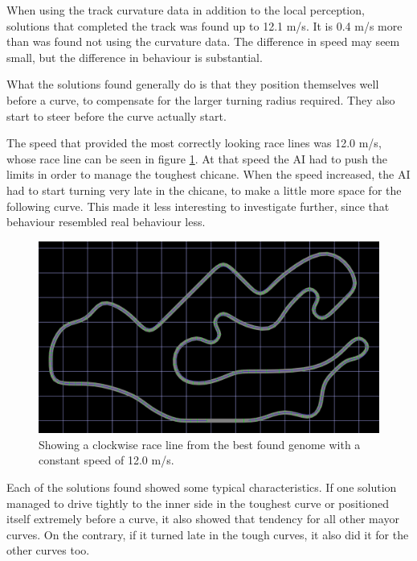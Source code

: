 

When using the track curvature data in addition to the local perception, solutions that completed the track was found up to 12.1 m/s. It is 0.4 m/s more than was found not using the curvature data. The difference in speed may seem small, but the difference in behaviour is substantial.

What the solutions found generally do is that they position themselves well before a curve, to compensate for the larger turning radius required. They also start to steer before the curve actually start.

The speed that provided the most correctly looking race lines was 12.0 m/s, whose race line can be seen in figure \ref{fig:constantspeedline}. At that speed the AI had to push the limits in order to manage the toughest chicane. When the speed increased, the AI had to start turning very late in the chicane, to make a little more space for the following curve. This made it less interesting to investigate further, since that behaviour resembled real behaviour less.

\begin{figure}[h]
\includegraphics[width=\textwidth]{report/images/fixed_curve_data}
\centering
\caption{Showing a clockwise race line from the best found genome with a constant speed of 12.0 m/s.}
\label{fig:constantspeedline}
\end{figure}

Each of the solutions found showed some typical characteristics. If one solution managed to drive tightly to the inner side in the toughest curve or positioned itself extremely before a curve, it also showed that tendency for all other mayor curves. On the contrary, if it turned late in the tough curves, it also did it for the other curves too.

